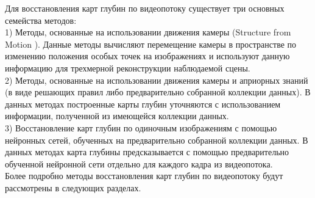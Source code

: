 \documentclass{mipt-thesis-bs}
\begin{document}
Для восстановления карт глубин по видеопотоку существует три основных семейства методов:\\
1) Методы, основанные на использовании движения камеры (Structure from Motion \cite{koenderink1991affine}). Данные методы вычисляют перемещение камеры в пространстве по изменению положения особых точек на изображениях и используют данную информацию для трехмерной реконструкции наблюдаемой сцены.\\
2) Методы, основанные на использовании движения камеры и априорных знаний (в виде решающих правил либо предварительно собранной коллекции данных). В данных методах построенные карты глубин уточняются с использованием информации, полученной из имеющейся коллекции данных.\\
3) Восстановление карт глубин по одиночным изображениям с помощью нейронных сетей, обученных на предварительно собранной коллекции данных. В данных методах карта глубины предсказывается с помощью предварительно обученной нейронной сети отдельно для каждого кадра из видеопотока.\\
Более подробно методы восстановления карт глубин по видеопотоку будут рассмотрены в следующих разделах.
\end{document}
